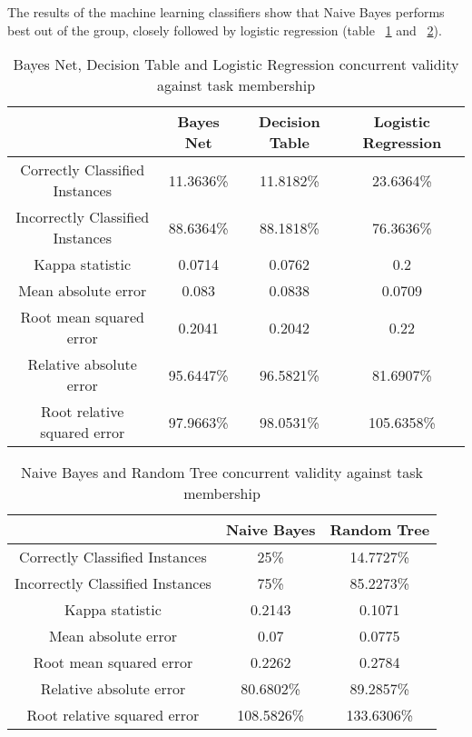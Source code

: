 The results of the machine learning classifiers show that Naive Bayes performs best out of the group, closely followed by logistic regression (table ~\ref{tab:ml1currenttask} and ~\ref{tab:ml2currenttask}). 

\begin{table}[!htbp]
\centering
\begin{tabular}{|c|c|c|c|}
\hline
                                 & Bayes Net  & Decision Table  & Logistic Regression \\ \hline
Correctly Classified Instances   & 11.3636\%      & 11.8182\%  & 23.6364\%  \\
Incorrectly Classified Instances & 88.6364\%      & 88.1818\% & 76.3636\%   \\
Kappa statistic                  & 0.0714         & 0.0762    & 0.2         \\
Mean absolute error              & 0.083          & 0.0838    & 0.0709      \\
Root mean squared error          & 0.2041         & 0.2042    & 0.22        \\
Relative absolute error          & 95.6447\%      & 96.5821\% & 81.6907\%   \\
Root relative squared error      & 97.9663\%      & 98.0531\% & 105.6358\%  \\
\hline
\end{tabular}
\caption{Bayes Net, Decision Table and Logistic Regression concurrent validity against task membership}
\label{tab:ml1currenttask}
\end{table}


\begin{table}[!htbp]
\centering
\begin{tabular}{|c|c|c|}
\hline
                                 & Naive Bayes & Random Tree\\ \hline
Correctly Classified Instances   & 25\%      &  14.7727\%\\
Incorrectly Classified Instances & 75\%      &  85.2273\%\\
Kappa statistic                  & 0.2143    & 0.1071\\
Mean absolute error              & 0.07      & 0.0775\\
Root mean squared error          & 0.2262    & 0.2784\\
Relative absolute error          & 80.6802\% & 89.2857\%\\
Root relative squared error      & 108.5826\% & 133.6306\%\\
\hline
\end{tabular}
\caption{Naive Bayes and Random Tree concurrent validity against task membership}
\label{tab:ml2currenttask}
\end{table}

